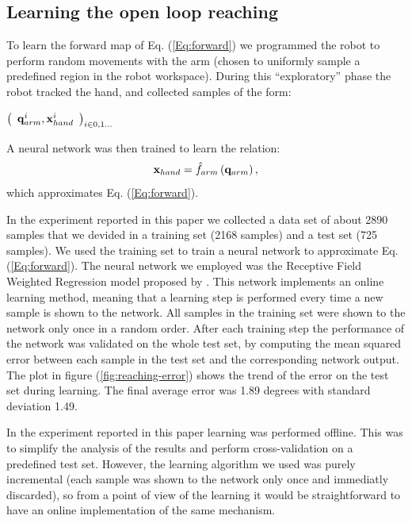 \subsection{Learning the open loop reaching}
\label{sec:learning-open-loop}
%
To learn the forward map of Eq. (\ref{Eq:forward}) we programmed 
the robot to perform random movements with the arm (chosen to uniformly sample 
a predefined region in the robot workspace). During this ``exploratory'' 
phase the robot tracked the hand, and collected samples of the form:
%
\begin{center}
\begin{math}
  \left(\begin{array}{cc}
    \mathbf q_{arm}^i , \mathbf{x}_{hand}^i\end{array}\right)_{i \in 0,1\dots}
\end{math}
\end{center}
%
A neural network was then trained to learn the relation:
%
\begin{equation} 
  \mathbf{x}_{hand}=\hat{f}_{arm}\left(\mathbf q_{arm} \right),
\end{equation}
%
which approximates Eq. (\ref{Eq:forward}).

In the experiment reported in this paper we collected a data set of 
about 2890 samples that we devided in a training set (2168 samples) and 
a test set (725 samples). We used the training set to train a neural 
network to approximate Eq. (\ref{Eq:forward}). The neural network 
we employed was the Receptive Field Weighted Regression model proposed 
by \cite{schaal98Constructive}. This network implements an online learning
method, meaning that a learning step is performed every time a new 
sample is shown to the network. All samples in the training set were shown
to the network only once in a random order. After each training step the 
performance of the network was validated on the whole test set, by computing
the mean squared error between each sample in the test set and the 
corresponding network output. The plot in figure (\ref{fig:reaching-error})
shows the trend of the error on the test set during learning. The final 
average error was 1.89 degrees with standard deviation 1.49.

In the experiment reported in this paper learning was performed offline. 
This was to simplify the analysis of the results and perform cross-validation 
on a predefined test set. However, the learning algorithm we used was purely 
incremental (each sample was shown to the network only once and immediatly 
discarded), so from a point of view of the learning it would be 
straightforward to have an online implementation of the same mechanism.

